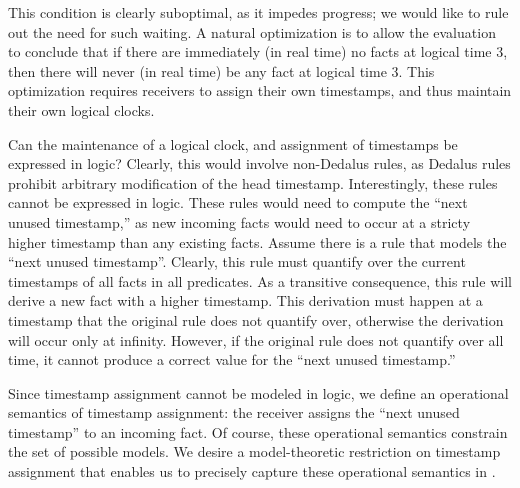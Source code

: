This condition is clearly  suboptimal, as it impedes progress; we would like to rule out the need for such waiting.  A natural optimization is to allow the evaluation to conclude that if there are immediately (in real time) no  facts at logical time 3, then there will never (in real time) be any  fact at logical time 3.  This optimization requires receivers to assign their own timestamps, and thus maintain their own logical clocks.

Can the maintenance of a logical clock, and assignment of timestamps be expressed in logic?  Clearly, this would involve non-Dedalus rules, as Dedalus rules prohibit arbitrary modification of the head timestamp.  Interestingly, these rules cannot be expressed in logic.  These rules would need to compute the ``next unused timestamp,''  as new incoming facts would need to occur at a stricty higher timestamp than any existing facts.  Assume there is a rule that models the ``next unused timestamp''.  Clearly, this rule must quantify over the current timestamps of all facts in all predicates.  As a transitive consequence, this rule will derive a new fact with a higher timestamp.  This derivation must happen at a timestamp that the original rule does not quantify over, otherwise the derivation will occur only at infinity.  However, if the original rule does not quantify over all time, it cannot produce a correct value for the ``next unused timestamp.'' 
 

Since timestamp assignment cannot be modeled in logic, we define an operational semantics of timestamp assignment:   the receiver assigns the ``next unused timestamp'' to an incoming fact.  Of course, these operational semantics constrain the set of possible models.  We desire a model-theoretic restriction on  timestamp assignment that enables us to precisely capture these operational semantics in \lang.

